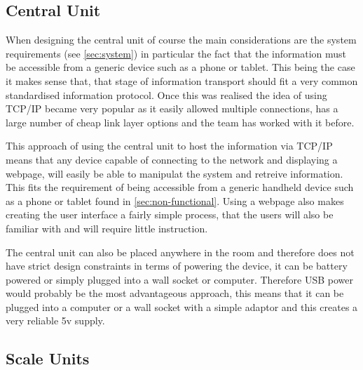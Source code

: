 \subsection{Central Unit}
\label{central design}
When designing the central unit of course the main considerations are the system requirements (see \ref{sec:system}) in particular the fact that the information must be accessible from a generic device such as a phone or tablet. This being the case it makes sense that, that stage of information transport should fit a very common standardised information protocol. Once this was realised the idea of using TCP/IP became very popular as it easily allowed multiple connections, has a large number of cheap link layer options and the team has worked with it before.

This approach of using the central unit to host the information via TCP/IP means that any device capable of connecting to the network and displaying a webpage, will easily be able to manipulat the system and retreive information. This fits the requirement of being accessible from a generic handheld device such as a phone or tablet found in \ref{sec:non-functional}. Using a webpage also makes creating the user interface a fairly simple process, that the users will also be familiar with and will require little instruction. 

The central unit can also be placed anywhere in the room and therefore does not have strict design constraints  in terms of powering the device, it can be battery powered or simply plugged into a wall socket or computer. Therefore USB power would probably be the most advantageous approach, this means that it can be plugged into a computer or a wall socket with a simple adaptor and this creates a very reliable 5v supply.

\subsection{Scale Units}



